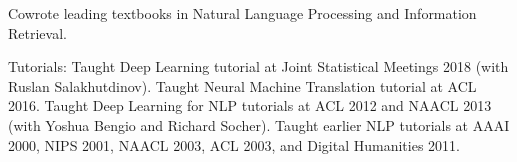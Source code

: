 \documentclass[11pt,letterpaper]{article}
\def\url#1{{\small\sf #1}}
\begin{document}
\begin{vita}
\begin{Products (other significant)}





\end{Products (other significant)}

\begin{Synergistic Activities}

\item Cowrote leading textbooks in Natural
  Language Processing and Information Retrieval.

\item Tutorials: Taught Deep Learning tutorial at Joint Statistical Meetings 2018 (with Ruslan Salakhutdinov).
Taught Neural Machine Translation tutorial at ACL 2016.
Taught Deep Learning for NLP tutorials at ACL 2012 and NAACL 2013 (with Yoshua Bengio and Richard Socher).
Taught earlier NLP tutorials at AAAI 2000, NIPS 2001, NAACL 2003, ACL 2003, and Digital Humanities 2011.


\end{Synergistic Activities}
\end{vita}
\end{document}
